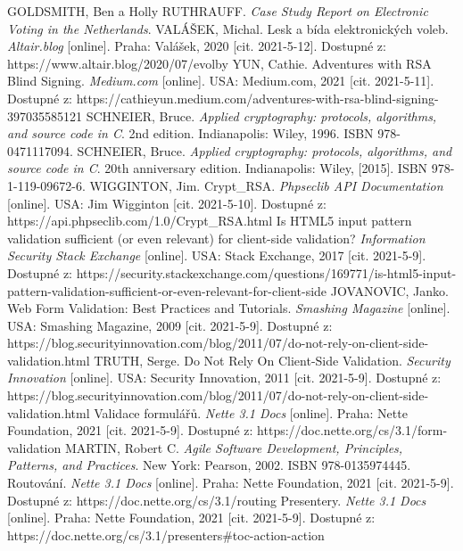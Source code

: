 \begin{thebibliography}{41}
GOLDSMITH, Ben a Holly RUTHRAUFF. \textit{Case Study Report on Electronic Voting in the Netherlands}.
VALÁŠEK, Michal. Lesk a bída elektronických voleb. \textit{Altair.blog} [online]. Praha: Valášek, 2020 [cit. 2021-5-12]. Dostupné z: https://www.altair.blog/2020/07/evolby
YUN, Cathie. Adventures with RSA Blind Signing. \textit{Medium.com} [online]. USA: Medium.com, 2021 [cit. 2021-5-11]. Dostupné z: https://cathieyun.medium.com/adventures-with-rsa-blind-signing-397035585121
SCHNEIER, Bruce. \textit{Applied cryptography: protocols, algorithms, and source code in C}. 2nd edition. Indianapolis: Wiley, 1996. ISBN 978-0471117094.
SCHNEIER, Bruce. \textit{Applied cryptography: protocols, algorithms, and source code in C}. 20th anniversary edition. Indianapolis: Wiley, [2015]. ISBN 978-1-119-09672-6.
WIGGINTON, Jim. Crypt\_RSA. \textit{Phpseclib API Documentation} [online]. USA: Jim Wigginton [cit. 2021-5-10]. Dostupné z: https://api.phpseclib.com/1.0/Crypt\_RSA.html
Is HTML5 input pattern validation sufficient (or even relevant) for client-side validation? \textit{Information Security Stack Exchange} [online]. USA: Stack Exchange, 2017 [cit. 2021-5-9]. Dostupné z: https://security.stackexchange.com/questions/169771/is-html5-input-pattern-validation-sufficient-or-even-relevant-for-client-side
JOVANOVIC, Janko. Web Form Validation: Best Practices and Tutorials. \textit{Smashing Magazine} [online]. USA: Smashing Magazine, 2009 [cit. 2021-5-9]. Dostupné z: https://blog.securityinnovation.com/blog/2011/07/do-not-rely-on-client-side-validation.html
TRUTH, Serge. Do Not Rely On Client-Side Validation. \textit{Security Innovation} [online]. USA: Security Innovation, 2011 [cit. 2021-5-9]. Dostupné z: https://blog.securityinnovation.com/blog/2011/07/do-not-rely-on-client-side-validation.html
Validace formulářů. \textit{Nette 3.1 Docs} [online]. Praha: Nette Foundation, 2021 [cit. 2021-5-9]. Dostupné z: https://doc.nette.org/cs/3.1/form-validation
MARTIN, Robert C. \textit{Agile Software Development, Principles, Patterns, and Practices}. New York: Pearson, 2002. ISBN 978-0135974445.
Routování. \textit{Nette 3.1 Docs} [online]. Praha: Nette Foundation, 2021 [cit. 2021-5-9]. Dostupné z: https://doc.nette.org/cs/3.1/routing
Presentery. \textit{Nette 3.1 Docs} [online]. Praha: Nette Foundation, 2021 [cit. 2021-5-9]. Dostupné z: https://doc.nette.org/cs/3.1/presenters\#toc-action-action

\end{thebibliography}
